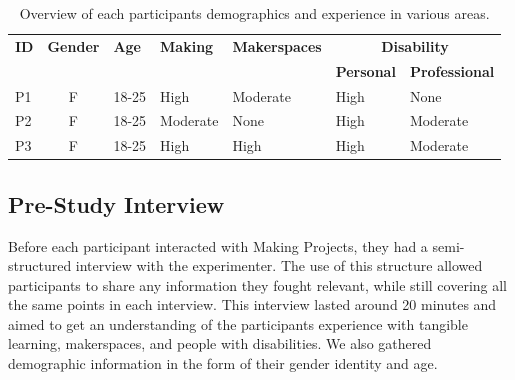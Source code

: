 \documentclass{l4proj}
\begin{document}
\begin{table}[]
\centering
\caption{Overview of each participants demographics and experience in various areas.}
\label{tab:participant-profiles}
\begin{tabular}{lccllll}
\hline
\rowcolor[HTML]{E6E6E6} 
\textbf{ID} & \multicolumn{1}{l}{\cellcolor[HTML]{E6E6E6}\textbf{Gender}} & \multicolumn{1}{l}{\cellcolor[HTML]{E6E6E6}\textbf{Age}} & \textbf{Making} & \textbf{Makerspaces} & \multicolumn{2}{c}{\cellcolor[HTML]{E6E6E6}\textbf{Disability}} \\
\rowcolor[HTML]{E6E6E6} 
\textbf{}   & \multicolumn{1}{l}{\cellcolor[HTML]{E6E6E6}\textbf{}}       & \multicolumn{1}{l}{\cellcolor[HTML]{E6E6E6}\textbf{}}    & \textbf{}       & \textbf{}            & \textbf{Personal}            & \textbf{Professional}            \\ \hline
P1          & F                                                           & 18-25                                                       & High            & Moderate             & High                         & None                             \\
P2          & F                                                             & 18-25                                                         & Moderate        & None                 & High                         & Moderate                         \\
P3          & F                                                            & 18-25                                                         & High            & High                 & High                         & Moderate                         \\ \hline
\end{tabular}
\end{table}

\subsection{Pre-Study Interview}
Before each participant interacted with Making Projects, they had a semi-structured interview with the experimenter. The use of this structure allowed participants to share any information they fought relevant, while still covering all the same points in each interview. This interview lasted around 20 minutes and aimed to get an understanding of the participants experience with tangible learning, makerspaces, and people with disabilities. We also gathered demographic information in the form of their gender identity and age. 
\end{document}
